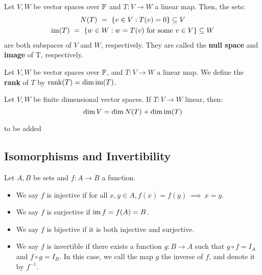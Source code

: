 \documentclass{article}
\begin{document}
\begin{thm}
Let $ V, W $ be vector spaces over $ \mathbb{F} $ and $ T:V \rightarrow W $ a linear map. Then, the sets:
\begin{gather*}
N(T) \ = \ \left\{{v \in V : T(v) = 0}\right\} \subseteq V \\
\operatorname{im}(T) \ = \ \left\{{w \in W : w = T(v) \textrm{ for some } v \in V}\right\} \subseteq W
\end{gather*}
are both subspaces of $ V $ and $ W $, respectively. They are called the \textbf{null space} and \textbf{image} of T, respectively.
\end{thm}

\begin{defn}
Let $ V, W $ be vector spaces over $ \mathbb{F} $, and $ T:V\rightarrow W $ a linear map. We define the \textbf{rank} of $ T $ by $ \rank(T) = \dim\operatorname{im}(T) $.
\end{defn}

\begin{thm}[title=The Dimension Theorem]
Let $ V, W $ be finite dimensional vector spaces. If $ T:V \rightarrow W $ linear, then:
\begin{equation*}
    \dim V = \dim N(T) + \dim\operatorname{im}(T)
\end{equation*}
\end{thm}

\begin{pf}[source=Primary Source Material]
to be added
\end{pf}

\subsection{Isomorphisms and Invertibility}

\begin{defn}
Let $ A, B $ be sets and $ f:A \rightarrow B $ a function.
\begin{itemize}
    \item We say $ f $ is injective if for all $ x, y \in A, f(x) = f(y) \ \implies \ x = y $.
    \item We say $ f $ is surjective if $ \operatorname{im} f = f(A) = B $.
    \item We say $ f $ is bijective if it is both injective and surjective.
    \item We say $ f $ is invertible if there exists a function $ g: B \rightarrow A $ such that $ g \circ f = I_{A} $ and $ f \circ g = I_{B} $.
        In this case, we call the map $ g $ the inverse of $ f $, and denote it by $ f^{-1} $.
\end{itemize}
\end{defn}
\end{document}
